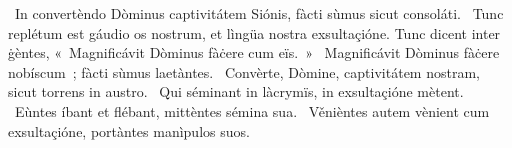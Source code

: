 \psalmChapterWithInscription{}
{ }
{%
~In convertèndo Dòminus captivitátem Siónis, fàcti sùmus sicut consoláti. 
~Tunc replétum est gáudio os nostrum, et lìngüa nostra exsultaçióne. Tunc dicent inter ġèntes, «~Magnificávit Dòminus fàċere cum eïs.~»
~Magnificávit Dòminus fàċere nobíscum~; fàcti sùmus laetàntes. 
~Convèrte, Dòmine, captivitátem nostram, sicut torrens in austro. 
~Qui séminant in làcrymïs, in exsultaçióne mètent. 
~Eùntes íbant et flébant, mittèntes sémina sua. 
~Věnièntes autem vènient cum exsultaçióne, portàntes manìpulos suos. 
}

